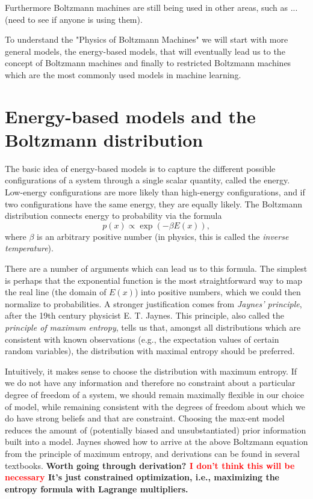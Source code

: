 \documentclass[nofootinbib, superscriptaddress, prl]{revtex4}
\begin{document}
Furthermore Boltzmann machines are still being used in other areas, such as ... (need to see if anyone is using them).

To understand the "Physics of Boltzmann Machines" we will start with more general models, the energy-based models, that will eventually lead us to the concept of Boltzmann machines and finally to restricted Boltzmann machines which are the most commonly used models in machine learning.

\section{Energy-based models and the Boltzmann distribution}

The basic idea of energy-based models is to capture the different possible configurations of a system through a single scalar quantity, called the energy. Low-energy configurations are more likely than high-energy configurations, and if two configurations have the same energy, they are equally likely. The Boltzmann distribution connects energy to probability via the formula
\begin{equation}
 p(x) \propto \exp(-\beta E(x)),
\end{equation}
where $\beta$ is an arbitrary positive number (in physics, this is called the \emph{inverse temperature}). 

There are a number of arguments which can lead us to this formula. The simplest is perhaps that the exponential function is the most straightforward way to map the real line (the domain of $E(x)$) into positive numbers, which we could then normalize to probabilities. A stronger justification comes from \emph{Jaynes' principle}, after the 19th century physicist E. T. Jaynes. This principle, also called the \emph{principle of maximum entropy}, tells us that, amongst all distributions which are consistent with known observations (e.g., the expectation values of certain random variables), the distribution with maximal entropy should be preferred.

\noindent{}

Intuitively, it makes sense to choose the distribution with maximum entropy. If we do not have any information and therefore no constraint about a particular degree of freedom of a system, we should remain maximally flexible in our choice of model, while remaining consistent with the degrees of freedom about which we do have strong beliefs and that are constraint. Choosing the max-ent model reduces the amount of (potentially biased and unsubstantiated) prior information built into a model. Jaynes showed how to arrive at the above Boltzmann equation from the principle of maximum entropy, and derivations can be found in several textbooks. \textbf{Worth going through derivation? \textcolor{red}{I don't think this will be necessary} It's just constrained optimization, i.e., maximizing the entropy formula with Lagrange multipliers.}
\end{document}
